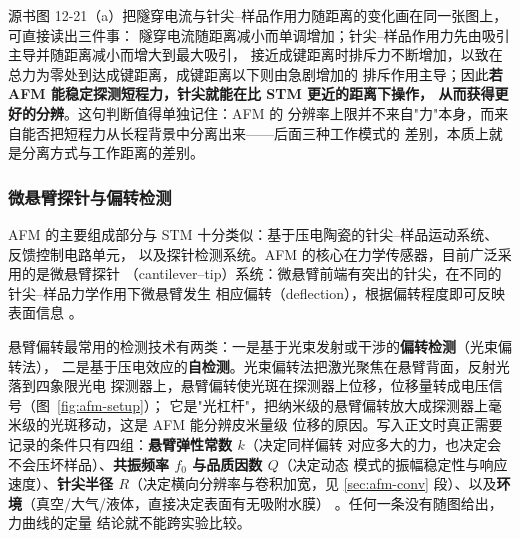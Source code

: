 源书图 12-21（a）把隧穿电流与针尖--样品作用力随距离的变化画在同一张图上，可直接读出三件事：
隧穿电流随距离减小而单调增加；针尖--样品作用力先由吸引主导并随距离减小而增大到最大吸引，
接近成键距离时排斥力不断增加，以致在总力为零处到达成键距离，成键距离以下则由急剧增加的
排斥作用主导；因此\textbf{若 AFM 能稳定探测短程力，针尖就能在比 STM 更近的距离下操作，
从而获得更好的分辨}。这句判断值得单独记住：AFM 的
分辨率上限并不来自"力"本身，而来自能否把短程力从长程背景中分离出来——后面三种工作模式的
差别，本质上就是分离方式与工作距离的差别。

\subsubsection{微悬臂探针与偏转检测}

AFM 的主要组成部分与 STM 十分类似：基于压电陶瓷的针尖--样品运动系统、反馈控制电路单元，
以及探针检测系统。AFM 的核心在力学传感器，目前广泛采用的是微悬臂探针
（cantilever--tip）系统：微悬臂前端有突出的针尖，在不同的针尖--样品力学作用下微悬臂发生
相应偏转（deflection），根据偏转程度即可反映表面信息
。

\begin{measure}
悬臂偏转最常用的检测技术有两类：一是基于光束发射或干涉的\textbf{偏转检测}（光束偏转法），
二是基于压电效应的\textbf{自检测}。光束偏转法把激光聚焦在悬臂背面，反射光落到四象限光电
探测器上，悬臂偏转使光斑在探测器上位移，位移量转成电压信号（图~\ref{fig:afm-setup}）；
它是"光杠杆"，把纳米级的悬臂偏转放大成探测器上毫米级的光斑移动，这是 AFM 能分辨皮米量级
位移的原因。写入正文时真正需要记录的条件只有四组：\textbf{悬臂弹性常数 $k$}（决定同样偏转
对应多大的力，也决定会不会压坏样品）、\textbf{共振频率 $f_0$ 与品质因数 $Q$}（决定动态
模式的振幅稳定性与响应速度）、\textbf{针尖半径 $R$}（决定横向分辨率与卷积加宽，见
\ref{sec:afm-conv} 段）、以及\textbf{环境}（真空/大气/液体，直接决定表面有无吸附水膜）
。任何一条没有随图给出，力曲线的定量
结论就不能跨实验比较。
\end{measure}

